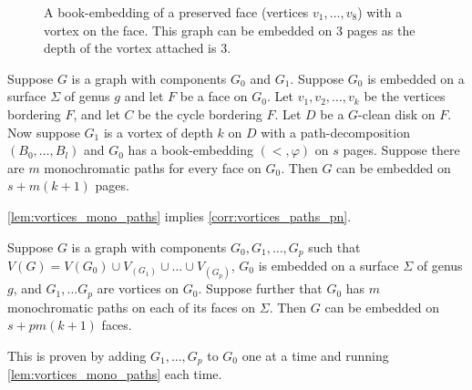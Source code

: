 \begin{figure}[h!]
	\centering
	
	\caption[Book-embedding of a preserved face]{A book-embedding of a preserved face (vertices $v_1, \ldots , v_8$) with a vortex on the face. This graph can be embedded on $3$ pages as the depth of the vortex attached is 3. }\label{fig:preserved_face}
\end{figure}

\begin{lemma}\label{lem:vortices_mono_paths}
	Suppose \(G\) is a graph with components \(G_0\) and \(G_1\). Suppose \(G_0\) is embedded on a surface \(\Sigma \) of genus \(g\) and let \(F\) be a face on \(G_0\). Let \(v_1, v_2, \ldots, v_k\) be the vertices bordering \(F\), and let \(C\) be the cycle bordering \(F\). Let \(D\) be a \(G\)-clean disk on \(F\). Now suppose \(G_1\) is a vortex of depth $k$ on \(D\) with a path-decomposition \((B_0, \ldots, B_l)\) and \(G_0\) has a book-embedding \((<, \varphi)\) on $s$ pages. Suppose there are \(m\) monochromatic paths for every face on $G_0$. Then \(G\) can be embedded on \(s + m(k+1)\) pages.
\end{lemma}

\cref{lem:vortices_mono_paths} implies \cref{corr:vortices_paths_pn}.

\begin{corollary}\label{corr:vortices_paths_pn}
	Suppose $G$ is a graph with components $G_0, G_1, \ldots, G_p$ such that $V(G) = V(G_0) \cup V_(G_1) \cup \ldots \cup V_(G_p)$, $G_0$ is embedded on a surface $\Sigma$ of genus $g$, and $G_1, \ldots G_p$ are vortices on $G_0$. Suppose further that $G_0$ has $m$ monochromatic paths on each of its faces on $\Sigma$. Then $G$ can be embedded on $s + pm(k+1)$ faces.
\end{corollary}

This is proven by adding $G_1, \ldots, G_p$ to $G_0$ one at a time and running \cref{lem:vortices_mono_paths} each time. 

